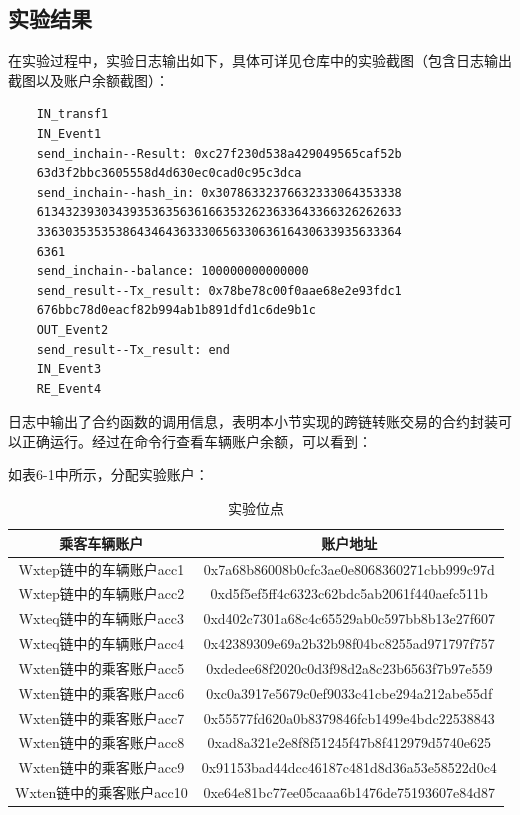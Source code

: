 \subsection{实验结果}

在实验过程中，实验日志输出如下，具体可详见仓库中的实验截图（包含日志输出截图以及账户余额截图）：

\begin{verbatim}
    IN_transf1
    IN_Event1
    send_inchain--Result: 0xc27f230d538a429049565caf52b
    63d3f2bbc3605558d4d630ec0cad0c95c3dca
    send_inchain--hash_in: 0x30786332376632333064353338
    613432393034393536356361663532623633643366326262633
    336303535353864346436333065633063616430633935633364
    6361
    send_inchain--balance: 100000000000000
    send_result--Tx_result: 0x78be78c00f0aae68e2e93fdc1
    676bbc78d0eacf82b994ab1b891dfd1c6de9b1c
    OUT_Event2
    send_result--Tx_result: end
    IN_Event3
    RE_Event4
\end{verbatim}

日志中输出了合约函数的调用信息，表明本小节实现的跨链转账交易的合约封装可以正确运行。经过在命令行查看车辆账户余额，可以看到：

如表6-1中所示，分配实验账户：

\begin{table}[H]
    \linespread{1.5}
    \centering
    \caption{实验位点}\label{实验位点}
    \begin{tabular}{cc} \toprule
        乘客车辆账户                  & 账户地址                                           \\ \hline
Wxtep链中的车辆账户acc1 & 0x7a68b86008b0cfc3ae0e8068360271cbb999c97d
        \\
Wxtep链中的车辆账户acc2   & 0xd5f5ef5ff4c6323c62bdc5ab2061f440aefc511b    
        \\
Wxteq链中的车辆账户acc3   & 0xd402c7301a68c4c65529ab0c597bb8b13e27f607
        \\
Wxteq链中的车辆账户acc4   & 0x42389309e69a2b32b98f04bc8255ad971797f757
        \\
Wxten链中的乘客账户acc5  & 0xdedee68f2020c0d3f98d2a8c23b6563f7b97e559
        \\
Wxten链中的乘客账户acc6   & 0xc0a3917e5679c0ef9033c41cbe294a212abe55df             \\
Wxten链中的乘客账户acc7   & 0x55577fd620a0b8379846fcb1499e4bdc22538843
        \\
Wxten链中的乘客账户acc8   & 0xad8a321e2e8f8f51245f47b8f412979d5740e625
        \\
Wxten链中的乘客账户acc9  & 0x91153bad44dcc46187c481d8d36a53e58522d0c4
        \\
Wxten链中的乘客账户acc10   & 0xe64e81bc77ee05caaa6b1476de75193607e84d87                             
        \\\bottomrule
    \end{tabular}
\end{table}

